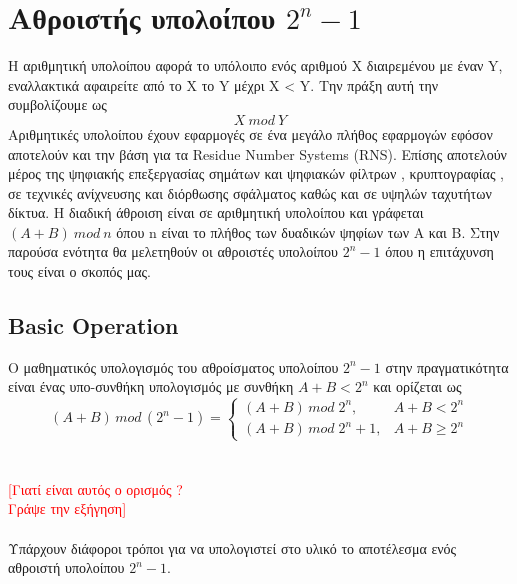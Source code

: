 \section{Αθροιστής υπολοίπου $2^n-1$}
Η αριθμητική υπολοίπου αφορά το υπόλοιπο ενός αριθμού X διαιρεμένου με έναν Y, εναλλακτικά
αφαιρείτε από το Χ το Y μέχρι X < Y. Την πράξη αυτή την συμβολίζουμε ως 
\begin{equation*}
    X\ mod\ Y
\end{equation*}
Αριθμητικές υπολοίπου έχουν εφαρμογές σε ένα μεγάλο πλήθος εφαρμογών εφόσον αποτελούν και 
την βάση για τα Residue Number Systems (RNS). Επίσης αποτελούν μέρος της ψηφιακής
επεξεργασίας σημάτων και ψηφιακών φίλτρων , κρυπτογραφίας , σε τεχνικές ανίχνευσης και διόρθωσης σφάλματος καθώς και σε υψηλών ταχυτήτων δίκτυα. Η διαδική άθροιση είναι σε 
αριθμητική υπολοίπου και γράφεται $(A+B)\ mod\ n$ όπου n είναι το πλήθος των δυαδικών 
ψηφίων των A και B. 
Στην παρούσα ενότητα θα μελετηθούν οι αθροιστές υπολοίπου $2^n-1$ όπου η επιτάχυνση τους είναι ο σκοπός μας.


\subsection{Basic Operation}
Ο μαθηματικός υπολογισμός του αθροίσματος υπολοίπου $2^n-1$ στην πραγματικότητα είναι 
ένας υπο-συνθήκη υπολογισμός με συνθήκη $A+B < 2^n$ και ορίζεται ως 
\begin{equation}
(A+B)\, mod\, (2^n-1) = 
\begin{cases}
    (A+B)\, mod\; 2^n       , &  A+B < 2^n\\
    (A+B)\, mod\; 2^n + 1   , & A+B \geq 2^n
\end{cases}
\end{equation}
\\\\
\textcolor{red}{[Γιατί είναι αυτός ο ορισμός ? \\ Γράψε την εξήγηση]}
\\\\
Υπάρχουν διάφοροι τρόποι για να υπολογιστεί στο υλικό το αποτέλεσμα 
ενός αθροιστή υπολοίπου $2^n-1$.

